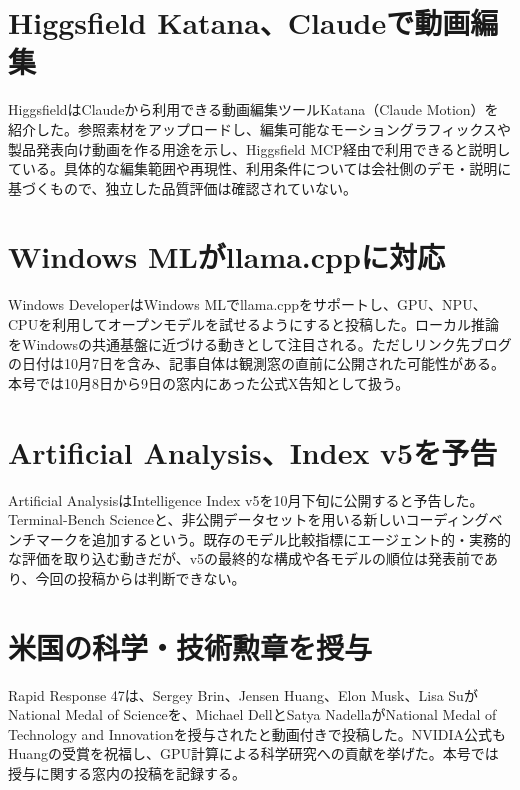 \section{Higgsfield Katana、Claudeで動画編集}
HiggsfieldはClaudeから利用できる動画編集ツールKatana（Claude Motion）を紹介した。参照素材をアップロードし、編集可能なモーショングラフィックスや製品発表向け動画を作る用途を示し、Higgsfield MCP経由で利用できると説明している。具体的な編集範囲や再現性、利用条件については会社側のデモ・説明に基づくもので、独立した品質評価は確認されていない。

\section{Windows MLがllama.cppに対応}
Windows DeveloperはWindows MLでllama.cppをサポートし、GPU、NPU、CPUを利用してオープンモデルを試せるようにすると投稿した。ローカル推論をWindowsの共通基盤に近づける動きとして注目される。ただしリンク先ブログの日付は10月7日を含み、記事自体は観測窓の直前に公開された可能性がある。本号では10月8日から9日の窓内にあった公式X告知として扱う。

\section{Artificial Analysis、Index v5を予告}
Artificial AnalysisはIntelligence Index v5を10月下旬に公開すると予告した。Terminal-Bench Scienceと、非公開データセットを用いる新しいコーディングベンチマークを追加するという。既存のモデル比較指標にエージェント的・実務的な評価を取り込む動きだが、v5の最終的な構成や各モデルの順位は発表前であり、今回の投稿からは判断できない。

\section{米国の科学・技術勲章を授与}
Rapid Response 47は、Sergey Brin、Jensen Huang、Elon Musk、Lisa SuがNational Medal of Scienceを、Michael DellとSatya NadellaがNational Medal of Technology and Innovationを授与されたと動画付きで投稿した。NVIDIA公式もHuangの受賞を祝福し、GPU計算による科学研究への貢献を挙げた。本号では授与に関する窓内の投稿を記録する。

